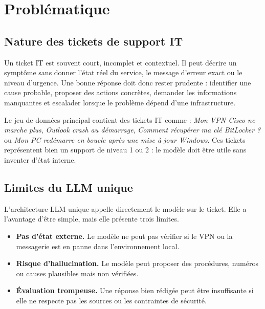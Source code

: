 
\chapter{Problématique}

\section{Nature des tickets de support IT}

Un ticket IT est souvent court, incomplet et contextuel. Il peut décrire un
symptôme sans donner l'état réel du service, le message d'erreur exact ou le
niveau d'urgence. Une bonne réponse doit donc rester prudente : identifier une
cause probable, proposer des actions concrètes, demander les informations
manquantes et escalader lorsque le problème dépend d'une infrastructure.

Le jeu de données principal contient des tickets IT comme :
\emph{Mon VPN Cisco ne marche plus}, \emph{Outlook crash au démarrage},
\emph{Comment récupérer ma clé BitLocker ?} ou \emph{Mon PC redémarre en
boucle après une mise à jour Windows}. Ces tickets représentent bien un support
de niveau 1 ou 2 : le modèle doit être utile sans inventer d'état interne.

\section{Limites du LLM unique}

L'architecture LLM unique appelle directement le modèle sur le ticket. Elle a
l'avantage d'être simple, mais elle présente trois limites.

\begin{itemize}
  \item \textbf{Pas d'état externe.} Le modèle ne peut pas vérifier si le VPN ou
  la messagerie est en panne dans l'environnement local.
  \item \textbf{Risque d'hallucination.} Le modèle peut proposer des procédures,
  numéros ou causes plausibles mais non vérifiées.
  \item \textbf{Évaluation trompeuse.} Une réponse bien rédigée peut être
  insuffisante si elle ne respecte pas les sources ou les contraintes de
  sécurité.
\end{itemize}

